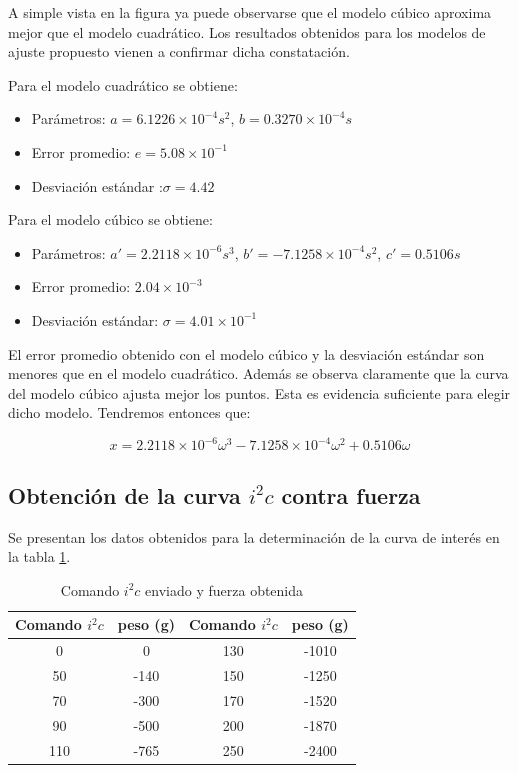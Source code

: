 \documentclass[main]{subfiles}
\begin{document}
A simple vista en la figura ya puede observarse que el modelo c\'ubico aproxima mejor que el modelo cuadr\'atico.
Los resultados obtenidos para los modelos de ajuste propuesto vienen a confirmar dicha constataci\'on.

Para el modelo cuadr\'atico se obtiene:
\begin{itemize}
\item Par\'ametros: $a=6.1226\times10^{-4}s^2$, $b=0.3270\times 10^{-4}s$
\item Error promedio: $e=5.08\times 10 ^{-1}$
\item Desviaci\'on est\'andar :$\sigma=4.42$
\end{itemize}

Para el modelo c\'ubico se obtiene:
\begin{itemize}
\item Par\'ametros: $a\prime = 2.2118\times 10^{-6}s^3$, $b\prime =-7.1258\times 10^{-4}s^2$, $c\prime=0.5106s$
\item Error promedio: $2.04\times10^{-3} $
\item Desviaci\'on est\'andar: $\sigma=4.01\times 10^{-1}$
\end{itemize}

El error promedio obtenido con el modelo c\'ubico y la desviaci\'on est\'andar son menores que en el modelo cuadr\'atico. Adem\'as se observa claramente que la curva del modelo c\'ubico ajusta mejor los puntos. Esta es evidencia suficiente para elegir dicho modelo. Tendremos entonces que:

$$
x=2.2118\times 10^{-6}\omega^3 -7.1258\times 10^{-4}\omega^2+0.5106\omega
$$
\subsection{Obtenci\'on de la curva $i^2c$ contra fuerza}
Se presentan los datos obtenidos para la determinaci\'on de la curva de inter\'es en la tabla \ref{tab:if}.
\begin{table}[H]
\centering
\begin{tabular}{|c|c|c|c|} 
	\hline
	\cellcolor[gray]{0.8} \textbf{Comando $i^2c$} & 
	\cellcolor[gray]{0.8} \textbf{peso (g)} & \cellcolor[gray]{0.8} \textbf{Comando $i^2c$} & 
	\cellcolor[gray]{0.8} \textbf{peso (g)}\\ \hline \hline
	  0 &      0  & 130 &-1010\\ \hline
	 50 &-140 &150 &-1250\\ \hline
	 70 &-300 &170 &-1520\\ \hline
	 90 & -500&200 &-1870 \\ \hline
	110 & -765 &250&-2400\\ \hline
\end{tabular}
\caption{Comando $i^2c$ enviado y fuerza obtenida}
\label{tab:if}
\end{table}
\end{document}
